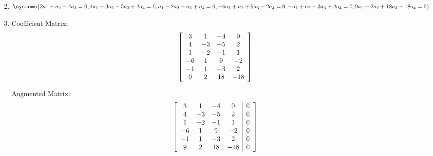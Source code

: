\documentclass{article}
\begin{document}
\begin{enumerate}[label = \textbf{\alph*)}]
\begin{align*}
		\end{align*}
	\item
		\[
		\systeme{
			3a_1 + a_2 - 4a_3 = 0,
			4a_1 - 3a_2 - 5a_3 + 2a_4 = 0,
			a_1 - 2a_2 - a_3 + a_4 = 0,
			-6a_1 + a_2 + 9a_3 - 2a_4 = 0,
			-a_1 + a_2 - 3a_3 + 2a_4 = 0,
			9a_1 + 2a_2 + 18a_3 - 18a_4 = 0
		}
		\]
	\item
		Coefficient Matrix:
		\begin{align*}
			\left[
			\begin{array}{ c c c c }
				3 & 1 & -4 & 0 \\
				4 & -3 & -5 & 2 \\
				1 & -2 & -1 & 1 \\
				-6 & 1 & 9 & -2 \\
				-1 & 1 & -3 & 2 \\
				9 & 2 & 18 & -18
			\end{array}
			\right]
		\end{align*}

		Augmented Matrix:
		\begin{align*}
			\left[
			\begin{array}{ c c c c | c }
				3 & 1 & -4 & 0 & 0 \\
				4 & -3 & -5 & 2 & 0 \\
				1 & -2 & -1 & 1 & 0 \\
				-6 & 1 & 9 & -2 & 0 \\
				-1 & 1 & -3 & 2 & 0 \\
				9 & 2 & 18 & -18 & 0
			\end{array}
			\right]
		\end{align*}
\end{enumerate}
\end{document}
